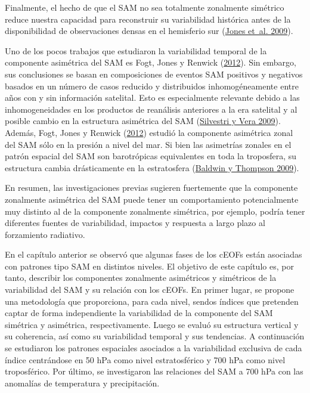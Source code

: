 \documentclass[12pt,oneside,a4paper]{reedthesis}
\begin{document}
Finalmente, el hecho de que el SAM no sea totalmente zonalmente simétrico reduce nuestra capacidad para reconstruir su variabilidad histórica antes de la disponibilidad de observaciones densas en el hemisferio sur (\protect\hyperlink{ref-jones2009}{Jones et~al. 2009}).

Uno de los pocos trabajos que estudiaron la variabilidad temporal de la componente asimétrica del SAM es Fogt, Jones y Renwick (\protect\hyperlink{ref-fogt2012}{2012}).
Sin embargo, sus conclusiones se basan en composiciones de eventos SAM positivos y negativos basados en un número de casos reducido y distribuidos inhomogéneamente entre años con y sin información satelital.
Esto es especialmente relevante debido a las inhomogeneidades en los productos de reanálisis anteriores a la era satelital y al posible cambio en la estructura asimétrica del SAM (\protect\hyperlink{ref-silvestri2009}{Silvestri y Vera 2009}).
Además, Fogt, Jones y Renwick (\protect\hyperlink{ref-fogt2012}{2012}) estudió la componente asimétrica zonal del SAM sólo en la presión a nivel del mar.
Si bien las asimetrías zonales en el patrón espacial del SAM son barotrópicas equivalentes en toda la troposfera, su estructura cambia drásticamente en la estratosfera (\protect\hyperlink{ref-baldwin2009}{Baldwin y Thompson 2009}).

En resumen, las investigaciones previas sugieren fuertemente que la componente zonalmente asimétrica del SAM puede tener un comportamiento potencialmente muy distinto al de la componente zonalmente simétrica, por ejemplo, podría tener diferentes fuentes de variabilidad, impactos y respuesta a largo plazo al forzamiento radiativo.

En el capítulo anterior se observó que algunas fases de los cEOFs están asociadas con patrones tipo SAM en distintos niveles.
El objetivo de este capítulo es, por tanto, describir los componentes zonalmente asimétricos y simétricos de la variabilidad del SAM y su relación con los cEOFs.
En primer lugar, se propone una metodología que proporciona, para cada nivel, sendos índices que pretenden captar de forma independiente la variabilidad de la componente del SAM simétrica y asimétrica, respectivamente.
Luego se evaluó su estructura vertical y su coherencia, así como su variabilidad temporal y sus tendencias.
A continuación se estudiaron los patrones espaciales asociados a la variabilidad exclusiva de cada índice centrándose en 50 hPa como nivel estratosférico y 700 hPa como nivel troposférico.
Por último, se investigaron las relaciones del SAM a 700 hPa con las anomalías de temperatura y precipitación.
\end{document}
